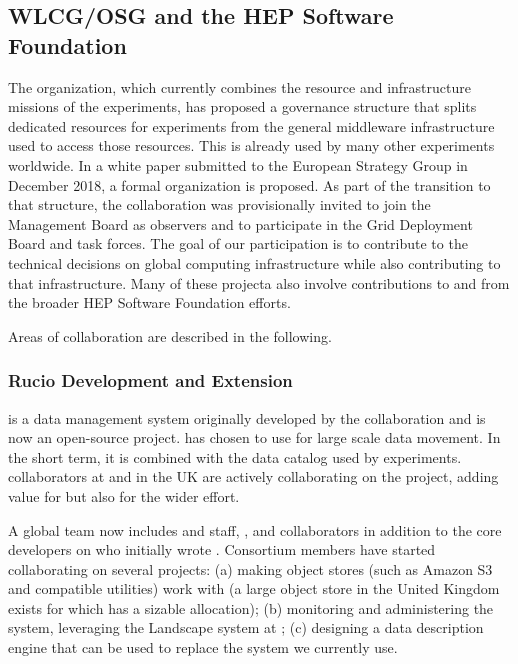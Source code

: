 \subsection{WLCG/OSG and the HEP Software Foundation}
The  \cite{Bird:2014ctt} organization, which currently combines the resource and infrastructure missions of the  experiments, has proposed a governance structure that splits dedicated resources for  experiments from the general middleware infrastructure used to access those resources.  This  is already used by many other experiments worldwide.  In a white paper submitted to the European Strategy Group in December 2018\cite{bib:BirdEUStrategy}, a formal  organization is proposed. As part of the transition to that structure, the  collaboration was provisionally invited to join the  Management Board as observers and to participate in the Grid Deployment Board and task forces. The goal of our participation is to contribute to the technical decisions on global computing infrastructure while also contributing to that infrastructure. 
Many of these projecta also involve contributions to and from the broader HEP Software Foundation efforts. 

Areas of collaboration are described in the following. 

\subsubsection{Rucio Development and Extension}

 \cite{Barisits:2019fyl}
is a data management system originally developed by the  collaboration and is now an open-source project.   has chosen to use  for large scale data movement.  In the short term, it is combined with the  data catalog used by  experiments.   collaborators at  and in the UK are actively collaborating on the  project, adding value for  but also for the wider effort.


A global  team now includes  and  staff, , and  collaborators  in addition to the core developers on  who initially wrote .  Consortium members have started collaborating on several projects:  (a) making object stores (such as Amazon S3 and compatible utilities) work with  (a large object store in the United Kingdom exists for which  has a sizable allocation);  (b) monitoring  and administering the  system, leveraging the Landscape system at ;  (c) designing a  data description engine that can be used to replace the  system we currently use.



